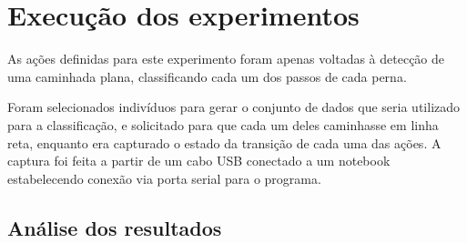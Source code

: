 \section{Execução dos experimentos}\label{sec:result_execucao}


As ações definidas para este experimento foram apenas voltadas à detecção de uma caminhada plana, classificando cada um dos passos de cada perna.

Foram selecionados indivíduos para gerar o conjunto de dados que seria utilizado para a classificação, e solicitado para que cada um deles caminhasse em linha reta, enquanto era capturado o estado da transição de cada uma das ações. A captura foi feita a partir de um cabo USB conectado a um notebook  estabelecendo conexão via porta serial para o programa.

\subsection{Análise dos resultados}\label{sec:result_analise}


